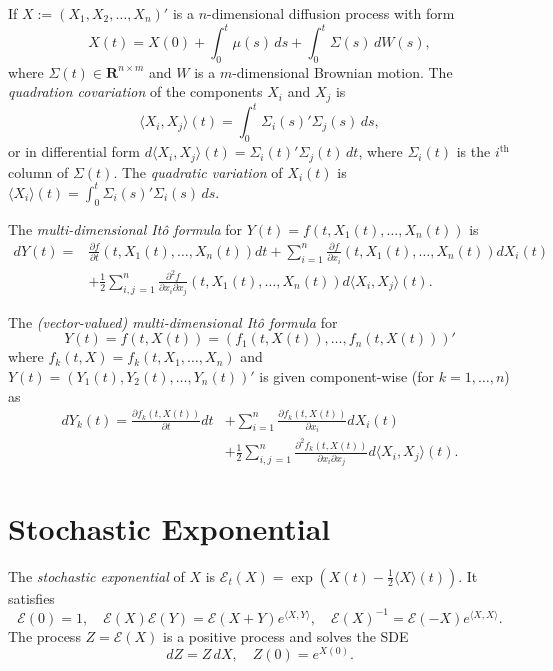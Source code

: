 \documentclass[twocolumn]{amsart}
\newcommand{\R}{\mathbf{R}}
\newcommand{\QV}[1]{\langle#1\rangle}
\newcommand{\sE}{\mathcal{E}}
\begin{document}
If $X := (X_1, X_2, \ldots, X_n)'$ is a $n$-dimensional diffusion process with form
\begin{equation*}
    X(t) = X(0) + \int_0^t \mu(s)\,ds + \int_0^t \Sigma(s)\,dW(s),
\end{equation*}
where $\Sigma(t) \in \R^{n \times m}$ and $W$ is a $m$-dimensional Brownian motion. The \emph{quadration covariation} of the components $X_i$ and $X_j$ is
\begin{equation*}
    \QV{X_i,X_j}(t) = \int_0^t \Sigma_i(s)' \Sigma_j(s)\,ds,
\end{equation*}
or in differential form $d\QV{X_i,X_j}(t) = \Sigma_i(t)'\Sigma_j(t)\,dt$, where $\Sigma_i(t)$ is the $i^\text{th}$ column of $\Sigma(t)$. The \emph{quadratic variation} of $X_i(t)$ is $\QV{X_i}(t) = \int_0^t \Sigma_i(s)' \Sigma_i(s)\,ds$.

The \emph{multi-dimensional It\^{o} formula} for $Y(t) = f(t, X_1(t), \ldots, X_n(t))$
is
\begin{align*}
    d Y(t) = &\frac{\partial f}{\partial t} (t,X_1(t), \ldots, X_n(t)) dt
            + \sum_{i=1}^n \frac{\partial f}{\partial x_i} (t,X_1(t), \ldots, X_n(t))dX_i(t) \\
            &+ \frac{1}{2}\sum_{i,j\,=1}^n \frac{\partial^2 f}{\partial x_i \partial x_j} (t,X_1(t), \ldots, X_n(t)) d \QV{X_i, X_j}(t).
\end{align*}


The \emph{(vector-valued) multi-dimensional It\^{o} formula} for
\begin{equation*}
    Y(t) = f(t,X(t)) = (f_1(t,X(t)), \ldots, f_n(t,X(t)))'
\end{equation*}
where $f_k(t, X) = f_k(t, X_1, \ldots, X_n)$ and $Y(t) = (Y_1(t), Y_2(t), \ldots, Y_n(t))'$ is given component-wise (for $k=1, \ldots, n$) as
\begin{align*}
    d Y_k(t) = \frac{\partial f_k(t,X(t))}{\partial t} dt
            &+ \sum_{i=1}^n \frac{\partial f_k(t,X(t))}{\partial x_i} dX_i(t) \\
            &+ \frac{1}{2}\sum_{i,j\,=1}^n \frac{\partial^2 f_k(t,X(t))}{\partial x_i \partial x_j} d \QV{X_i, X_j}(t).
\end{align*}

\section*{Stochastic Exponential}
The \emph{stochastic exponential} of $X$ is $\sE_t(X) = \exp({X(t) - \frac12 \QV{X}(t)})$. It satisfies
\begin{equation*}
    \sE(0) = 1, \quad \sE(X)\sE(Y) = \sE(X+Y)e^{\QV{X,Y}}, \quad \sE(X)^{-1} = \sE(-X) e^{\QV{X,X}}.
\end{equation*}
The process $Z = \sE(X)$ is a positive process and solves the SDE
\begin{equation*}
    dZ = Z\,dX, \quad Z(0) = e^{X(0)}.
\end{equation*}
\end{document}

